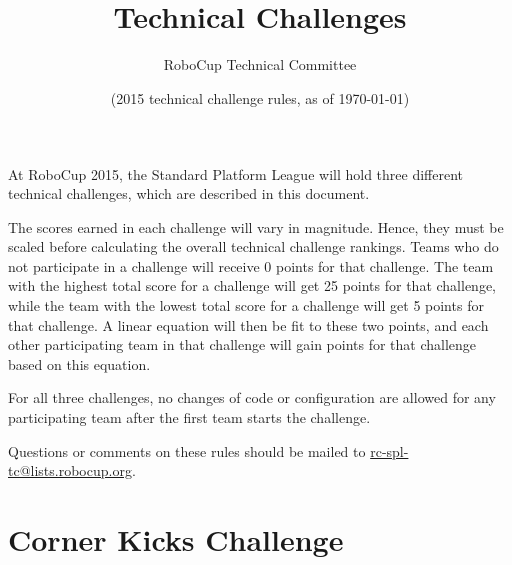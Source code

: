 \documentclass[12pt]{article}
\title{\leaguename \\ Technical Challenges}
\author{RoboCup Technical Committee}
\date{(2015 technical challenge rules, as of \today)}
\begin{document}
\maketitle

At RoboCup 2015, the Standard Platform League will hold three different technical challenges, which are described in this document.

The scores earned in each challenge will vary in magnitude.  Hence, they must be scaled before calculating the overall technical challenge rankings.  Teams who do not participate in a challenge will receive 0 points for that challenge.  The team with the highest total score for a challenge will get 25 points for that challenge, while the team with the lowest total score for a challenge will get 5 points for that challenge.  A linear equation will then be fit to these two points, and each other participating team in that challenge will gain points for that challenge based on this equation.

For all three challenges, no changes of code or configuration are allowed for any participating team after the first team starts the challenge. 

Questions or comments on these rules should be mailed to {\small \url{rc-spl-tc@lists.robocup.org}}.

\vfill

\renewcommand\contentsname{Challenges}
\tableofcontents
\setcounter{tocdepth}{1}

\thispagestyle{fancy}

\clearpage

\cfoot{\thepage}
\setcounter{page}{1}

\newcommand{\openMinNum}{three}




\section{Corner Kicks Challenge}
\end{document}

